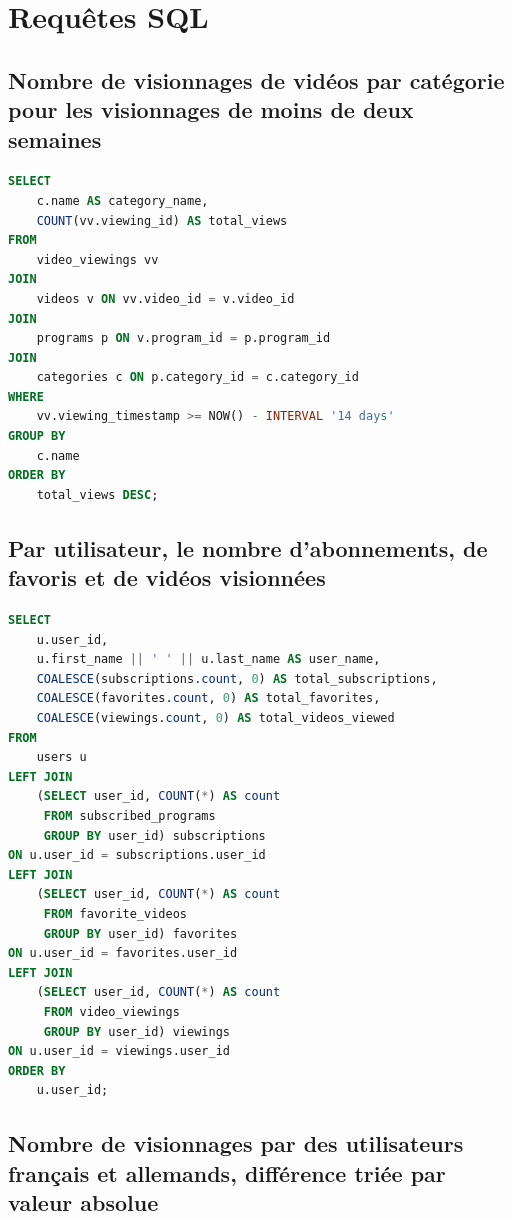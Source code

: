 \documentclass{article}
\begin{document}
\section{Requêtes SQL}

\subsection{Nombre de visionnages de vidéos par catégorie pour les visionnages de moins de deux semaines}

\begin{lstlisting}[language=SQL]
SELECT 
    c.name AS category_name,
    COUNT(vv.viewing_id) AS total_views
FROM 
    video_viewings vv
JOIN 
    videos v ON vv.video_id = v.video_id
JOIN 
    programs p ON v.program_id = p.program_id
JOIN 
    categories c ON p.category_id = c.category_id
WHERE 
    vv.viewing_timestamp >= NOW() - INTERVAL '14 days'
GROUP BY 
    c.name
ORDER BY 
    total_views DESC;
\end{lstlisting}

\subsection{Par utilisateur, le nombre d'abonnements, de favoris et de vidéos visionnées}

\begin{lstlisting}[language=SQL]
SELECT 
    u.user_id,
    u.first_name || ' ' || u.last_name AS user_name,
    COALESCE(subscriptions.count, 0) AS total_subscriptions,
    COALESCE(favorites.count, 0) AS total_favorites,
    COALESCE(viewings.count, 0) AS total_videos_viewed
FROM 
    users u
LEFT JOIN 
    (SELECT user_id, COUNT(*) AS count 
     FROM subscribed_programs 
     GROUP BY user_id) subscriptions 
ON u.user_id = subscriptions.user_id
LEFT JOIN 
    (SELECT user_id, COUNT(*) AS count 
     FROM favorite_videos 
     GROUP BY user_id) favorites 
ON u.user_id = favorites.user_id
LEFT JOIN 
    (SELECT user_id, COUNT(*) AS count 
     FROM video_viewings 
     GROUP BY user_id) viewings 
ON u.user_id = viewings.user_id
ORDER BY 
    u.user_id;
\end{lstlisting}

\subsection{Nombre de visionnages par des utilisateurs français et allemands, différence triée par valeur absolue}
\end{document}
